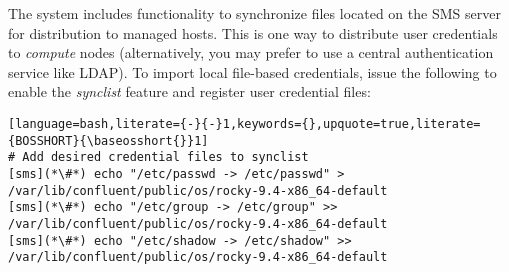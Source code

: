The \Confluent{} system includes functionality to synchronize files located on the
SMS server for distribution to managed hosts. This is one way to
distribute user credentials to {\em compute} nodes (alternatively, you may
prefer to use a central authentication service like LDAP). To import local file-based
credentials, issue the following to enable the {\em synclist} feature and
register user credential files:

\begin{lstlisting}[language=bash,literate={-}{-}1,keywords={},upquote=true,literate={BOSSHORT}{\baseosshort{}}1]
# Add desired credential files to synclist
[sms](*\#*) echo "/etc/passwd -> /etc/passwd" > /var/lib/confluent/public/os/rocky-9.4-x86_64-default
[sms](*\#*) echo "/etc/group -> /etc/group" >> /var/lib/confluent/public/os/rocky-9.4-x86_64-default
[sms](*\#*) echo "/etc/shadow -> /etc/shadow" >> /var/lib/confluent/public/os/rocky-9.4-x86_64-default
\end{lstlisting}
